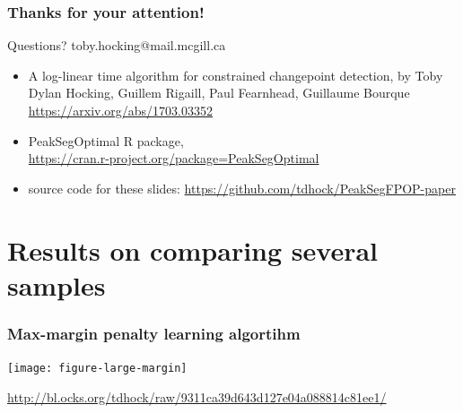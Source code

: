 \documentclass{beamer}
\begin{document}
  

\begin{frame}
  \frametitle{Thanks for your attention!}

  Questions? toby.hocking@mail.mcgill.ca
  \begin{itemize}
  \item A log-linear time algorithm for constrained changepoint
    detection, by Toby Dylan Hocking, Guillem Rigaill, Paul Fearnhead,
    Guillaume Bourque \url{https://arxiv.org/abs/1703.03352}
  \item 
  PeakSegOptimal R package, \\
\url{https://cran.r-project.org/package=PeakSegOptimal}
  \item source code for these slides:
  \url{https://github.com/tdhock/PeakSegFPOP-paper}
  \end{itemize}
\end{frame}

\section*{Results on comparing several samples}




\begin{frame}
  \frametitle{Max-margin penalty learning algortihm}
  \texttt{[image: figure-large-margin]}
 
\scriptsize \url{http://bl.ocks.org/tdhock/raw/9311ca39d643d127e04a088814c81ee1/}

\end{frame}
\end{document}
